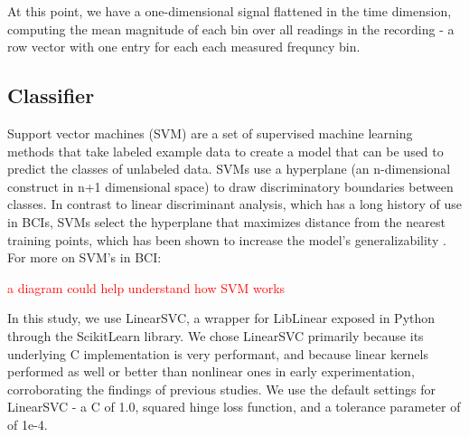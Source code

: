 



At this point, we have a one-dimensional signal flattened in the time dimension, computing the mean magnitude of each bin over all readings in the recording - a row vector with one entry for each each measured frequncy bin. 

\subsection{Classifier}

Support vector machines (SVM) are a set of supervised machine learning methods that take labeled example data to create a model that can be used to predict the classes of unlabeled data. SVMs use a hyperplane (an n-dimensional construct in n+1 dimensional space) to draw discriminatory boundaries between classes. In contrast to linear discriminant analysis, which has a long history of use in BCIs, SVMs select the hyperplane that maximizes distance from the nearest training points, which has been shown to increase the model's generalizability \cite{burges_tutorial_1998}.  For more on SVM's in BCI: \cite{garrett_comparison_2003,grierson_better_2011} 

\textcolor{red}{a diagram could help understand how SVM works}

In this study, we use LinearSVC, \cite{fan_liblinear:_2008} a wrapper for LibLinear exposed in Python through the ScikitLearn library. \cite{pedregosa_scikit-learn:_2011} We chose LinearSVC primarily because its underlying C implementation is very performant, and because linear kernels performed as well or better than nonlinear ones in early experimentation, corroborating the findings of previous studies. \cite{garrett_comparison_2003,lotte_review_2007}  We use the default settings for LinearSVC - a C of 1.0, squared hinge loss function, and a tolerance parameter of of 1e-4. 

